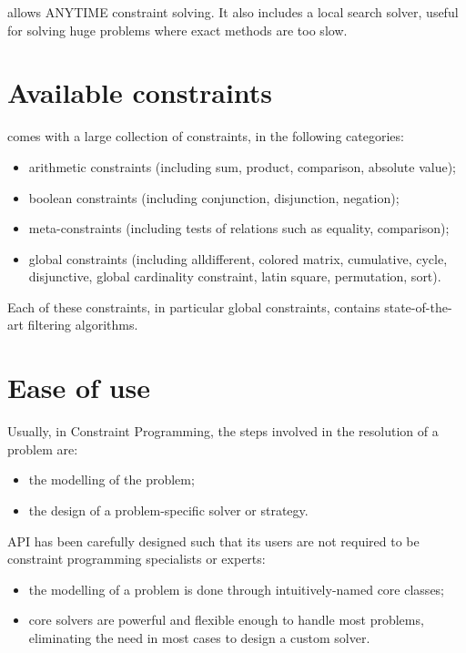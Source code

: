 \documentclass[twocolumn,a4paper,11pt]{article}
\def\cp{Constraint Programming}
\begin{document}
{\jcs} allows ANYTIME constraint solving. 
It also includes a local search solver, useful for solving huge problems
where exact methods are too slow.

\section*{\color{Blue}Available constraints}
{\jcs} comes with a large collection of constraints, in the following categories:
\begin{itemize}
\item arithmetic constraints (including sum, product, comparison, absolute value);
\item boolean constraints (including conjunction, disjunction, negation);
\item meta-constraints (including tests of relations such as equality, comparison);
\item global constraints (including alldifferent, colored matrix, cumulative, cycle,
  disjunctive, global cardinality constraint, latin square, permutation, sort).
\end{itemize}
Each of these constraints, in particular global constraints, 
contains state-of-the-art filtering algorithms.

\section*{\color{Blue}Ease of use}
Usually, in {\cp}, 
the steps involved in the resolution of a problem are: 
\begin{itemize}
\item the modelling of the problem;
\item the design of a problem-specific solver or strategy.
\end{itemize}
{\jcs} {\java} API has been carefully designed such that its users
are not required to be constraint programming specialists or {\java} experts:
\begin{itemize}
\item the modelling of a problem is done through {\jcs} intuitively-named core classes;
\item {\jcs} core solvers are powerful and flexible enough to handle most problems,
eliminating the need in most cases to design a custom solver.
\end{itemize}
\end{document}
